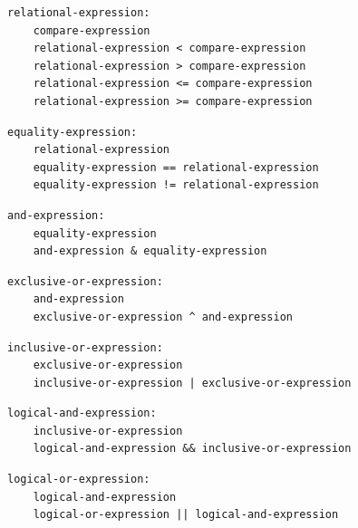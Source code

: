 \noindent\textbf{\texttt{}}\par
\begin{lstlisting}
relational-expression:
    compare-expression
    relational-expression < compare-expression
    relational-expression > compare-expression
    relational-expression <= compare-expression
    relational-expression >= compare-expression
\end{lstlisting}

\noindent\textbf{\texttt{}}\par
\begin{lstlisting}
equality-expression:
    relational-expression
    equality-expression == relational-expression
    equality-expression != relational-expression
\end{lstlisting}

\noindent\textbf{\texttt{}}\par
\begin{lstlisting}
and-expression:
    equality-expression
    and-expression & equality-expression
\end{lstlisting}

\noindent\textbf{\texttt{}}\par
\begin{lstlisting}
exclusive-or-expression:
    and-expression
    exclusive-or-expression ^ and-expression
\end{lstlisting}

\noindent\textbf{\texttt{}}\par
\begin{lstlisting}
inclusive-or-expression:
    exclusive-or-expression
    inclusive-or-expression | exclusive-or-expression
\end{lstlisting}

\noindent\textbf{\texttt{}}\par
\begin{lstlisting}
logical-and-expression:
    inclusive-or-expression
    logical-and-expression && inclusive-or-expression
\end{lstlisting}

\noindent\textbf{\texttt{}}\par
\begin{lstlisting}
logical-or-expression:
    logical-and-expression
    logical-or-expression || logical-and-expression
\end{lstlisting}

